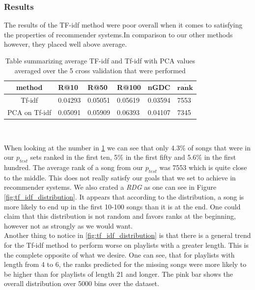 \subsubsection{Results}

The results of the TF-idf method were poor overall when it comes to satisfying the properties of recommender systems.In comparison to our other methods however, they placed well above average. \\

\begin{table}[hbt!]
\centering
\renewcommand{\arraystretch}{1.5}
\begin{tabu} to 1\textwidth {| c || X[c] | X[c] | X[c] | X[c] | X[c] | }
 \hline
 \textbf{method} & \textbf{R@10} & \textbf{R@50} & \textbf{R@100} & \textbf{nGDC} & $ \boldsymbol{\overline{rank}} $ \\
 \hline
 \hline
 Tf-idf & 0.04293 & 0.05051 & 0.05619 & 0.03594 & 7553 \\
 \hline
 PCA on Tf-idf & 0.05091 & 0.05909 & 0.06393 & 0.04107 & 7345 \\
 \hline
\end{tabu} \\
\caption{Table summarizing average TF-idf and Tf-idf with PCA values averaged over the 5 cross validation that were performed}
\label{table:1}
\end{table}

When looking at the number in \ref{table:1} we can see that only 4.3\% of songs that were in our $p_{test}$ sets ranked in the first ten, 5\% in the first fifty and 5.6\% in the first hundred. The average rank of a song from our $p_{test}$ was 7553 which is quite close to the middle. This does not really satisfy our goals that we set to achieve in recommender systems. We also crated a \textit{RDG} as one can see in Figure \ref{fig:tf_idf_distribution}. It appears that according to the distribution, a song is more likely to end up in the first 10-100 songs than it is at the end. One could claim that this distribution is not random and favors ranks at the beginning, however not as strongly as we would want.\\
Another thing to notice in \ref{fig:tf_idf_distribution} is that there is a general trend for the Tf-idf method to perform worse on playlists with a greater length. This is the complete opposite of what we desire. One can see, that for playlists with length from 4 to 6, the ranks predicted for the missing songs were more likely to be higher than for playlists of length 21 and longer. The pink bar shows the overall distribution over 5000 bins over the dataset. 


